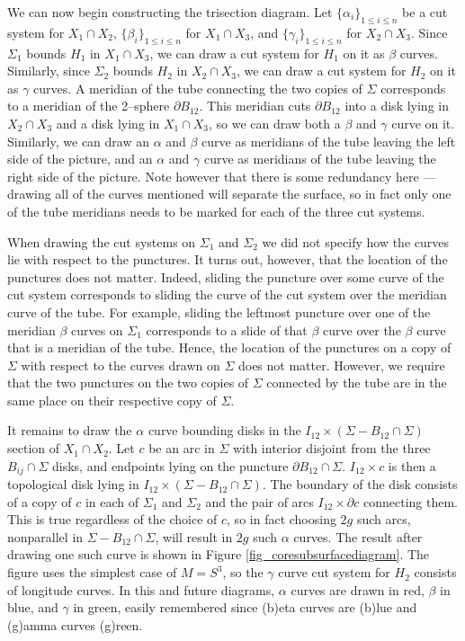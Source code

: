 \documentclass[12pt]{amsart}
\newcommand{\del}{\partial }
\theoremstyle{definition}
\theoremstyle{remark}
\begin{document}
We can now begin constructing the trisection diagram.  Let $\{\alpha_i\}_{1 \le i \le n}$ be a cut system for $X_1 \cap X_2$, $\{\beta_i\}_{1 \le i \le n}$ for $X_1 \cap X_3$, and $\{\gamma_i\}_{1 \le i \le n}$ for $X_2 \cap X_3$.  Since $\Sigma_1$ bounds $H_1$ in $X_1 \cap X_3$, we can draw a cut system for $H_1$ on it as $\beta$ curves.  Similarly, since $\Sigma_2$ bounds $H_2$ in $X_2 \cap X_3$, we can draw a cut system for $H_2$ on it as $\gamma$ curves.  A meridian of the tube connecting the two copies of $\Sigma$ corresponds to a meridian of the 2--sphere $\del B_{12}$.  This meridian cuts $\del B_{12}$ into a disk lying in $X_2 \cap X_3$ and a disk lying in $X_1 \cap X_3$, so we can draw both a $\beta$ and $\gamma$ curve on it.  Similarly, we can draw an $\alpha$ and $\beta$ curve as meridians of the tube leaving the left side of the picture, and an $\alpha$ and $\gamma$ curve as meridians of the tube leaving the right side of the picture.  Note however that there is some redundancy here --- drawing all of the curves mentioned will separate the surface, so in fact only one of the tube meridians needs to be marked for each of the three cut systems.

When drawing the cut systems on $\Sigma_1$ and $\Sigma_2$ we did not specify how the curves lie with respect to the punctures.  It turns out, however, that the location of the punctures does not matter.  Indeed, sliding the puncture over some curve of the cut system corresponds to sliding the curve of the cut system over the meridian curve of the tube.  For example, sliding the leftmost puncture over one of the meridian $\beta$ curves on $\Sigma_1$ corresponds to a slide of that $\beta$ curve over the $\beta$ curve that is a meridian of the tube.  Hence, the location of the punctures on a copy of $\Sigma$ with respect to the curves drawn on $\Sigma$ does not matter.  However, we require that the two punctures on the two copies of $\Sigma$ connected by the tube are in the same place on their respective copy of $\Sigma$.  

It remains to draw the $\alpha$ curve bounding disks in the $I_{12} \times (\Sigma - B_{12} \cap \Sigma)$ section of $X_1 \cap X_2$.   Let $c$ be an arc in $\Sigma$ with interior disjoint from the three $B_{ij} \cap \Sigma$ disks, and endpoints lying on the puncture $\del B_{12} \cap \Sigma$.  $I_{12} \times c$ is then a topological disk lying in $I_{12} \times (\Sigma - B_{12} \cap \Sigma)$.  The boundary of the disk consists of a copy of $c$ in each of $\Sigma_1$ and $\Sigma_2$ and the pair of arcs $I_{12} \times \del c$ connecting them.  This is true regardless of the choice of $c$, so in fact choosing $2g$ such arcs, nonparallel in $\Sigma - B_{12} \cap \Sigma$, will result in $2g$ such $\alpha$ curves.  The result after drawing one such curve is shown in Figure \ref{fig_coresubsurfacediagram}.  The figure uses the simplest case of $M = S^3$, so the $\gamma$ curve cut system for $H_2$ consists of longitude curves.  In this and future diagrams, $\alpha$ curves are drawn in red, $\beta$ in blue, and $\gamma$ in green, easily remembered since (b)eta curves are (b)lue and (g)amma curves (g)reen.
\end{document}
